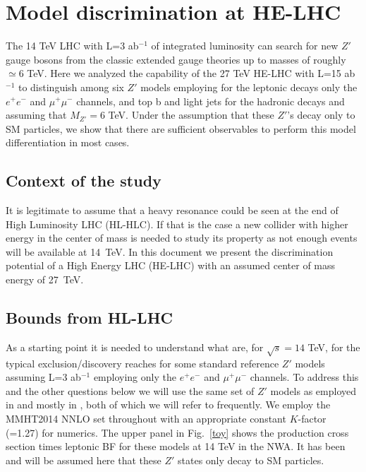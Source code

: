 \section{Model discrimination at HE-LHC}
The 14 TeV LHC with L=3 ab$^{-1}$ of integrated luminosity can search for new $Z'$ gauge bosons from the classic extended gauge theories up to masses 
of roughly $\simeq 6$ TeV.  Here we analyzed the capability of the 27 TeV HE-LHC with L=15 ab$^{-1}$ to distinguish among six $Z'$ models employing for the leptonic decays only 
the $e^+e^-$ and $\mu^+\mu^-$ channels, and top b and light jets for the hadronic decays and assuming that $M_{Z'}=6$ TeV. Under the assumption that these $Z'$'s decay only to SM particles,  we show that 
there are sufficient observables to perform this model differentiation in most cases. 

\subsection{Context of the study}
It is legitimate to assume that a heavy resonance could be seen at the end of High Luminosity LHC (HL-HLC). If that is the case a new collider with higher energy 
in the center of mass is needed to study its property as not enough events will be available at 14~TeV. In this document we present the discrimination potential of a High Energy LHC (HE-LHC)
with an assumed center of mass energy of 27~TeV.


\subsection{Bounds from HL-LHC}
As a starting point it is needed to understand what are, for $\sqrt s=14$ TeV, for the typical exclusion/discovery reaches for some standard reference $Z'$ models assuming L=3 ab$^{-1}$ 
employing only the $e^+e^-$ and $\mu^+\mu^-$ channels. To address this and the other questions below we will use the same set of $Z'$ models as employed 
in \cite{Rizzo:2014xma} and mostly in \cite{Han:2013mra}, both of which we will refer to frequently. We employ the MMHT2014 NNLO set \cite{Harland-Lang:2014zoa} 
throughout with an appropriate constant $K$-factor (=1.27) for numerics. 
The upper panel in Fig.~\ref{toy} shows the production cross section times leptonic BF for these models at 14 TeV in the NWA. It has 
been and will be assumed here that these $Z'$ states only decay to SM particles. 

